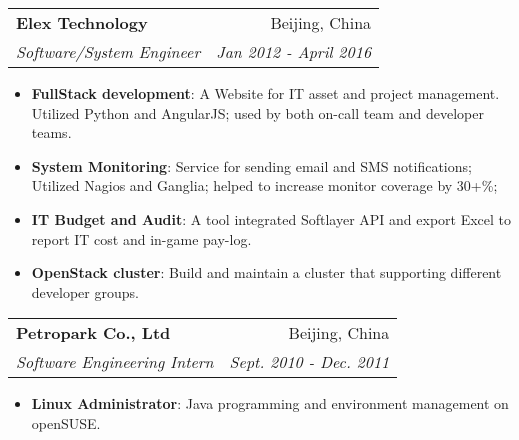 \documentclass[letterpaper,12pt]{article}
\makeatletter
\newcommand{\resumeItem}[2]{
\item\small{
  \textbf{#1}{: #2 \vspace{-2pt}}
}
}
\newcommand{\resumeSubheading}[4]{
  \vspace{-1pt}\item
  \begin{tabular*}{0.97\textwidth}[t]{l@{\extracolsep{\fill}}r}
    \textbf{#1} & #2 \\
    \textit{\small#3} & \textit{\small #4} \\
  \end{tabular*}\vspace{-5pt}
}
\newcommand{\resumeSubSubheading}[2]{
  \begin{tabular*}{0.97\textwidth}{l@{\extracolsep{\fill}}r}
    \textit{\small#1} & \textit{\small #2} \\
  \end{tabular*}\vspace{-5pt}
}
\newcommand{\resumeSubHeadingListEnd}{\end{itemize}}
\newcommand{\resumeItemListStart}{\begin{itemize}}
\newcommand{\resumeItemListEnd}{\end{itemize}\vspace{-5pt}}
\makeatother
\begin{document}
            

            \resumeSubheading
                {Elex Technology}{Beijing, China}
                {Software/System Engineer}{Jan 2012 - April 2016}
                \resumeItemListStart
                \resumeItem{FullStack development}{A Website for IT asset and project management. Utilized Python and AngularJS; used by both on-call team and developer teams.}
                \resumeItem{System Monitoring}{Service for sending email and SMS notifications; Utilized Nagios and Ganglia; helped to increase monitor coverage by 30+\%;}
                \resumeItem{IT Budget and Audit}{A tool integrated Softlayer API and export Excel to report IT cost and in-game pay-log.}
                \resumeItem{OpenStack cluster}{Build and maintain a cluster that supporting different developer groups.}
                \resumeItemListEnd

                \resumeSubheading
                    { Petropark Co., Ltd}{Beijing, China}
                    {Software Engineering Intern}{Sept. 2010 - Dec. 2011}
                    \resumeItemListStart
                    \resumeItem{Linux Administrator}{Java programming and environment management on openSUSE.}
                    \resumeItemListEnd
\end{document}
